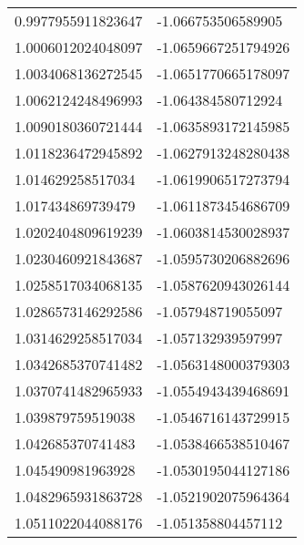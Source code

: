 \begin{supertabular}{ll}
0.9977955911823647  & -1.066753506589905    \\
1.0006012024048097  & -1.0659667251794926   \\
1.0034068136272545  & -1.0651770665178097   \\
1.0062124248496993  & -1.064384580712924    \\
1.0090180360721444  & -1.0635893172145985   \\
1.0118236472945892  & -1.0627913248280438   \\
1.014629258517034   & -1.0619906517273794   \\
1.017434869739479   & -1.0611873454686709   \\
1.0202404809619239  & -1.0603814530028937   \\
1.0230460921843687  & -1.0595730206882696   \\
1.0258517034068135  & -1.0587620943026144   \\
1.0286573146292586  & -1.057948719055097    \\
1.0314629258517034  & -1.057132939597997    \\
1.0342685370741482  & -1.0563148000379303   \\
1.0370741482965933  & -1.0554943439468691   \\
1.039879759519038   & -1.0546716143729915   \\
1.042685370741483   & -1.0538466538510467   \\
1.045490981963928   & -1.0530195044127186   \\
1.0482965931863728  & -1.0521902075964364   \\
1.0511022044088176  & -1.051358804457112    \\
\end{supertabular}
